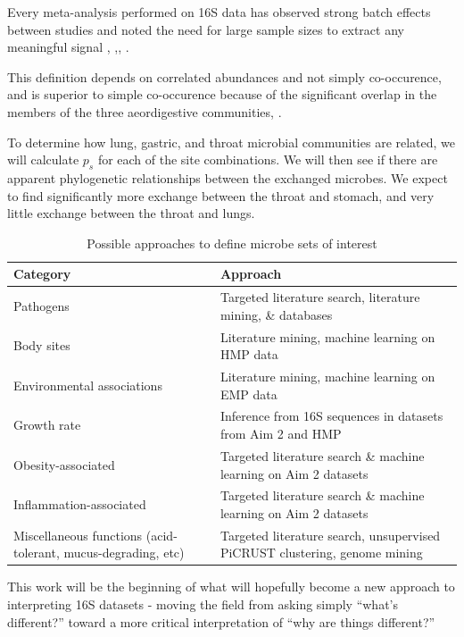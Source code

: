 \documentclass[12pt]{article}
\begin{document}
Every meta-analysis performed on 16S data has observed 
strong batch effects between studies and noted the need for large 
sample sizes to extract any meaningful signal \cite{sze-signal-2016},
\cite{walters-ob_meta-2014},\cite{knights-supervised-2010},
\cite{lozupone-meta-2013}. 

This definition depends on correlated abundances and not simply co-occurence, and is 
superior to simple co-occurence because of the significant overlap in the
members of the three aeordigestive communities\cite{bassis-source-2015}, \cite{charslon-topographical-2011}.

To determine how lung, gastric, and throat microbial communities are related,
we will calculate $p_s$ for each of the site combinations. We will 
then see if there are apparent phylogenetic relationships between
the exchanged microbes. We expect to find significantly more exchange
between the throat and stomach, and very little exchange between the throat and lungs. 




\begin{table}
\begin{tabular}{|p{6cm}|p{10cm}|}
	\hline
	\textbf{Category} & \textbf{Approach} \\
	\hline
	Pathogens & Targeted literature search, literature mining, \& 
	databases \\
	\hline
	Body sites & Literature mining, machine learning on HMP data \\
	\hline
	Environmental associations & Literature mining, machine learning 
	on EMP data \\
	\hline
	Growth rate & Inference from 16S sequences in datasets from Aim 2 
	and HMP \\
	\hline
	Obesity-associated & Targeted literature search \& machine 
	learning on Aim 2 datasets \\
	\hline
	Inflammation-associated & Targeted literature search \& machine 
	learning on Aim 2 datasets \\
	\hline
	Miscellaneous functions (acid-tolerant, mucus-degrading, etc) & 
	Targeted literature search, unsupervised PiCRUST clustering, 
	genome mining \\
	\hline 
\end{tabular}
\caption{Possible approaches to define microbe sets of interest}\label{tab:microbe_set_categories}
\end{table}



This work will be the beginning of what will hopefully become a new 
approach to interpreting 16S datasets - moving the field from asking 
simply ``what's different?'' toward a more critical interpretation of 
``why are things different?''



\end{document}
